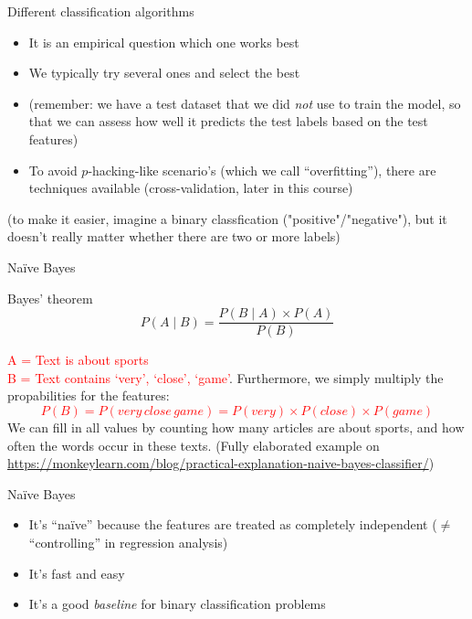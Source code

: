 \documentclass[compress]{beamer}
\begin{document}
\begin{frame}{Different classification algorithms}

\begin{itemize}[<+->]
	\item It is an empirical question which one works best
	\item We typically try several ones and select the best
	\item (remember: we have a test dataset that we did \emph{not} use to train the model, so that we can assess how well it predicts the test labels based on the test features)
	\item To avoid $p$-hacking-like scenario's (which we call ``overfitting''), there are techniques available (cross-validation, later in this course)
\end{itemize}
(to make it easier, imagine a binary classfication ("positive"/"negative"), but it doesn't really matter whether there are two or more labels)
\end{frame}






\begin{frame}{Naïve Bayes}
	\begin{block}{Bayes' theorem}
		$$ P(A \mid B) = \frac{P(B \mid A) \times P(A)}{P(B)} $$
	\end{block}
	\pause
	\textcolor{red}{A = Text is about sports\\
		B = Text contains `very', `close', `game'}.
	\pause
	Furthermore, we simply multiply the propabilities for the features:
	\textcolor{red}{$$P(B) = P(very\, close\, game) = P(very) \times P(close) \times P(game)$$}
	We can fill in all values by counting how many articles are about sports, and how often the words occur in these texts.
	\vspace{0.3cm}
	\footnotesize{
		(Fully elaborated example on \url{https://monkeylearn.com/blog/practical-explanation-naive-bayes-classifier/})}
\end{frame}

\begin{frame}{Naïve Bayes}
	\begin{itemize}[<+->]
		\item It's ``naïve'' because the features are treated as completely independent ($\neq$ ``controlling'' in regression analysis)
		\item It's fast and easy
		\item It's a good \emph{baseline} for binary classification problems
	\end{itemize}
\end{frame}
\end{document}
